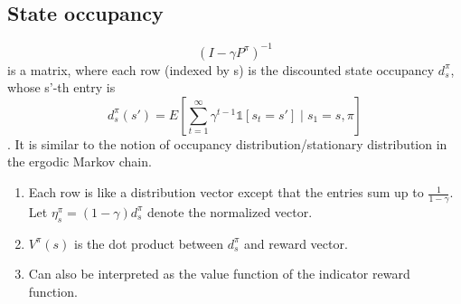 \documentclass{report}
\begin{document}
\subsection{State occupancy}
\[(I-\gamma P^{\pi})^{-1}\] is a matrix, where each row (indexed by s) is the discounted state occupancy $d_s^{\pi}$, whose s'-th entry is \[d_s^{\pi}(s')=E[\sum_{t=1}^{\infty}\gamma^{t-1} \mathbb{1}[s_t=s'] \mid s_1=s,\pi]\]. It is similar to the notion of occupancy distribution/stationary distribution in the ergodic Markov chain.
\begin{enumerate}
    \item Each row is like a distribution vector except that the entries sum up to $\frac{1}{1-\gamma}$. Let $\eta_{s}^{\pi}=(1-\gamma)d_s^{\pi}$ denote the normalized vector.
    \item $V^{\pi}(s)$ is the dot product between $d_s^{\pi}$ and reward vector.
    \item Can also be interpreted as the value function of the indicator reward function.
\end{enumerate}
\end{document}
